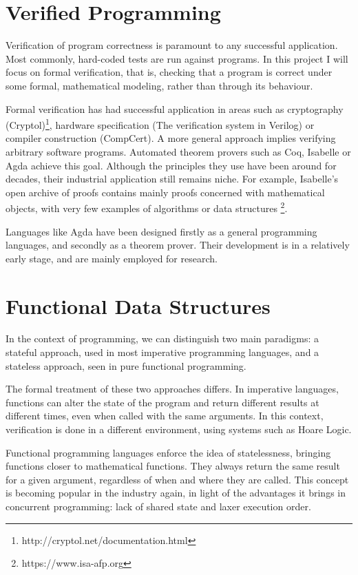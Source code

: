 \documentclass[12pt,twoside,notitlepage]{report}
\begin{document}
\section{Verified Programming}

Verification of program correctness is paramount to any successful application. Most commonly, hard-coded tests are run against programs. In this project I will focus on formal verification, that is, checking that a program is correct under some formal, mathematical modeling, rather than through its behaviour.
	
Formal verification has had successful application in areas such as cryptography (Cryptol)\footnote{http://cryptol.net/documentation.html}, hardware specification (The verification system in Verilog) or compiler construction (CompCert)\cite{compcert}. 
A more general approach implies verifying arbitrary software programs. Automated theorem provers such as Coq, Isabelle or Agda achieve this goal. Although the principles they use have been around for decades, their industrial application still remains niche. For example, Isabelle’s open archive of proofs contains mainly proofs concerned with mathematical objects, with very few examples of algorithms or data structures \footnote{https://www.isa-afp.org}. 
	
Languages like Agda\cite{agdatutorial} have been designed firstly as a general programming languages, and secondly as a theorem prover. Their development is in a relatively early stage, and are mainly employed for research. 

\section{Functional Data Structures}

In the context of programming, we can distinguish two main paradigms: a stateful approach, used in most imperative programming languages, and a stateless approach, seen in pure functional programming.

The formal treatment of these two approaches differs. In imperative languages, functions can alter the state of the program and return different results at different times, even when called with the same arguments. In this context, verification is done in a different environment, using systems such as Hoare Logic.

Functional programming languages enforce the idea of statelessness, bringing functions closer to mathematical functions. They always return the same result for a given argument, regardless of when and where they are called. This concept is becoming popular in the industry again, in light of the advantages it brings in concurrent programming: lack of shared state and laxer execution order.
 
\end{document}
